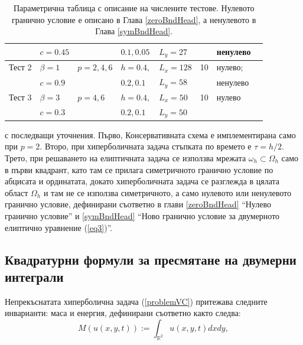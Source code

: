 \documentclass[a4paper]{article}
\newcommand{\rf}[1]{(\ref{#1})}
\newcommand{\RR}{\mathbb{R}}
\theoremstyle{remark}
\begin{document}
\begin{large}
\begin{table}
\begin{tabular}{||c|l|l|l|l|l|l|l||}
          &      $c=0.45$       &                           	&    $ 0.1, 0.05$   	& $L_y=27	$    	&        		&     ненулево 		\\
	   		\hline
			\hline 
Тест 2	&      $\beta = 1$	&      $p=2, 4, 6$    	&     $h=0.4,$      	& $L_x = 128$    &   10    	&   нулево;  \\
           &      $c=0.9$      	&                       		&      $0.2, 0.1$     & $L_y=58$         	&          		&   ненулево   \\
	   		\hline
			\hline 
Тест 3	&      $\beta = 3$	&      $p=4, 6$    	&     $h=0.4,$      	& $L_x = 50$    &   10    	&   нулево  \\
           &      $c=0.3$      	&                       		&      $0.2, 0.1$     & $L_y=50$         	&          		&      \\
	   \hline
			\hline 
		\end{tabular}
\caption{Параметрична таблица с описание на числените тестове. Нулевото гранично условие е описано в Глава \ref{zeroBndHead}, а ненулевото в Глава \ref{symBndHead}.}
\label{tableP}
\end{table}
с последващи уточнения. Първо, Консервативната схема е имплементирана само при $p=2$. Второ, при хиперболичната задача стъпката по времето е $\tau = h/2$. Трето, при решаването на елиптичната задача се използва мрежата $\omega_h \subset \Omega_h$ само в първи квадрант, като там се прилага симетричното гранично условие по абцисата и ординатата, докато хиперболичната задача се разглежда в цялата област $\Omega_h$ и там не се използва симетричното, а само нулевото или ненулевото гранично условие, дефинирани съответно в глави \ref{zeroBndHead} ``Нулево гранично условие'' и \ref{symBndHead} ``Ново гранично условие за двумерното елиптично уравнение \rf{eq3}''.

\subsection{Квадратурни формули за пресмятане на двумерни интеграли}\label{quadratureFormulas}
Непрекъснатата хиперболична задача \rf{problemVC} притежава следните инварианти: маса и енергия, дефинирани съответно както следва:
\begin{equation}\label{intM}
M(u(x,y,t)):=\int_{\RR^2} u(x,y,t)dx dy,
\end{equation}


\end{large}
\end{document}
